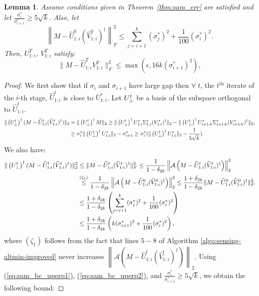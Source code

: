 \documentclass[11pt]{article}
\renewcommand{\eqref}[1]{\hyperref[#1]{(\ref*{#1})}}
\theoremstyle{plain}
\newtheorem{lemma}[theorem]{Lemma}
\theoremstyle{definition}
\newcommand{\twonorm}[1]{\left\| {#1} \right\|_2}
\newcommand{\aff}{{\mathcal A}}
\newcommand{\Vo}{V^*}
\newcommand{\So}{\Sigma^*}
\newcommand{\Uo}{U^*}
\newcommand{\so}{\sigma^*}
\newcommand{\Vw}{\widehat{V}}
\newcommand{\Uw}{\widehat{U}}
\begin{document}
\begin{lemma}\label{lemma:cond-num-bad-altmin-performance}
Assume conditions given in Theorem~\ref{thm:sam_err} are satisfied and  let $\frac{\so_i}{\so_{i+1}} \geq 5\sqrt{k}$. Also, let $$\left\|M - \widehat{U}^0_{1:i}(\widehat{V}^0_{1:i})^{\dag}\right\|_F^2 \leq \sum_{j=i+1}^k (\so_j)^2 + \frac{1}{100} (\so_i)^2.$$ Then, $U^T_{1:i}$, $V^T_{1:i}$ satisfy:$$\|M-\Uw^T_{1:i}V^T_{1:i}\|_F^2\leq \max(\epsilon, 16k(\so_{i+1})^2),$$
\end{lemma}
\begin{proof}
We first show that if $\sigma_i$ and $\sigma_{i+1}$ have large gap then $\forall\; t$, the $t^{\textrm{th}}$ iterate of the $i$-th stage, $\Uw^t_{1:i}$ is close to $\Uo_{1:i}$. Let $U_{\perp}^t$ be a basis of the subspace orthogonal to $\Uw^t_{1:i}$. 
\begin{align}
  \|\left(\Up^t\right)^\dag(M-\Uw^t_{1:i}(\Vw^t_{1:i})^\dag)\|_2&=\|\left(\Up^t\right)^\dag M\|_2\geq \|\left(\Up^t\right)^\dag\Uo_{1:i}\So_{1:i}(\Vo_{1:i})^\dag\|_2-\|\left(\Up^t\right)^\dag\Uo_{i+1:k}\So_{i+1:k}(\Vo_{i+1:k})^\dag\|_2,\nonumber\\
&\geq \so_i\|\left(\Up^t\right)^\dag\Uo_{1:i}\|_2-\so_{i+1}\geq \so_i(\|\left(\Up^t\right)^\dag\Uo_{1:i}\|_2-\frac{1}{5\sqrt{k}}). \label{eq:sam_bc_uperp1}
\end{align}
We also have:
\begin{align}
\|\left(\Up^t\right)^\dag(M-\Uw^t_{1:i}(\Vw^t_{1:i})^\dag)\|_2^2 &
	\leq \|M-\Uw^t_{1:i}(\Vw^t_{1:i})^\dag\|_F^2\leq \frac{1}{1-\delta_{2k}}\twonorm{\aff\left(M-\Uw^t_{1:i}(\Vw^t_{1:i})^\dag\right)}^2 \nonumber\\
	&\stackrel{(\zeta_1)}{\leq} \frac{1}{1-\delta_{2k}}\twonorm{\aff\left(M-\Uw^0_{1:i}(\Vw^0_{1:i})^\dag\right)}^2 \leq \frac{1+\delta_{2k}}{1-\delta_{2k}}\|M-\Uw^0_{1:i}(\Vw^0_{1:i})^\dag\|_F^2 \nonumber\\
	&\leq \frac{1+\delta_{2k}}{1-\delta_{2k}} \left(\sum_{j=i+1}^k \soj + \frac{1}{100} \soi\right) \nonumber\\
	&\leq \frac{1+\delta_{2k}}{1-\delta_{2k}} \left(k\soii+\frac{1}{100}\soi\right), \label{eq:sam_bc_uperp2}
\end{align}
where $(\zeta_1)$ follows from the fact that lines $5-8$ of Algorithm \ref{algo:sensing-altmin-improved} never increases $\twonorm{\aff\left(M-\Uw^t_{1:i}(\Vw^t_{1:i})^\dag\right)}$.
Using \eqref{eq:sam_bc_uperp1}, \eqref{eq:sam_bc_uperp2}, and $\frac{\so_i}{\so_{i+1}} \geq 5\sqrt{k}$, we obtain the following bound:

\end{proof}
\end{document}
